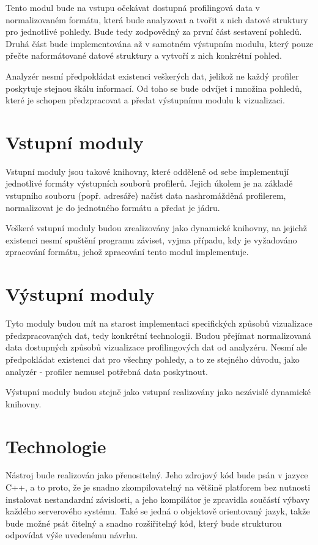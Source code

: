 \documentclass[czech,BP]{thesiskiv}
\begin{document}
Tento modul bude na vstupu očekávat dostupná profilingová data v normalizovaném formátu, která bude analyzovat a tvořit z nich datové struktury pro jednotlivé pohledy. Bude tedy zodpovědný za první část sestavení pohledů. Druhá část bude implementována až v samotném výstupním modulu, který pouze přečte naformátované datové struktury a vytvoří z nich konkrétní pohled.

Analyzér nesmí předpokládat existenci veškerých dat, jelikož ne každý profiler poskytuje stejnou škálu informací. Od toho se bude odvíjet i množina pohledů, které je schopen předzpracovat a předat výstupnímu modulu k vizualizaci.

\section{Vstupní moduly}

Vstupní moduly jsou takové knihovny, které odděleně od sebe implementují jednotlivé formáty výstupních souborů profilerů. Jejich úkolem je na základě vstupního souboru (popř. adresáře) načíst data nashromážděná profilerem, normalizovat je do jednotného formátu a předat je jádru. 

Veškeré vstupní moduly budou zrealizovány jako dynamické knihovny, na jejichž existenci nesmí spuštění programu záviset, vyjma případu, kdy je vyžadováno zpracování formátu, jehož zpracování tento modul implementuje.

\section{Výstupní moduly}

Tyto moduly budou mít na starost implementaci specifických způsobů vizualizace předzpracovaných dat, tedy konkrétní technologii. Budou přejímat normalizovaná data dostupných způsobů vizualizace profilingových dat od analyzéru. Nesmí ale předpokládat existenci dat pro všechny pohledy, a to ze stejného důvodu, jako analyzér - profiler nemusel potřebná data poskytnout.

Výstupní moduly budou stejně jako vstupní realizovány jako nezávislé dynamické knihovny.

\section{Technologie}

Nástroj bude realizován jako přenositelný. Jeho zdrojový kód bude psán v jazyce C++, a to proto, že je snadno zkompilovatelný na většině platforem bez nutnosti instalovat nestandardní závislosti, a jeho kompilátor je zpravidla součástí výbavy každého serverového systému. Také se jedná o objektově orientovaný jazyk, takže bude možné psát čitelný a snadno rozšiřitelný kód, který bude strukturou odpovídat výše uvedenému návrhu.
\end{document}
